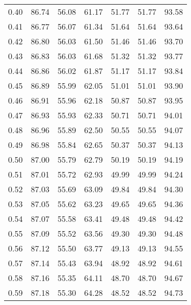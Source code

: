 \begin{tabular}{|c|c|c|c|c|c|c|}
      0.40 &     86.74 &     56.08 &      61.17 &   51.77 &      51.77 &         93.58 \\
      0.41 &     86.77 &     56.07 &      61.34 &   51.64 &      51.64 &         93.64 \\
      0.42 &     86.80 &     56.03 &      61.50 &   51.46 &      51.46 &         93.70 \\
      0.43 &     86.83 &     56.03 &      61.68 &   51.32 &      51.32 &         93.77 \\
      0.44 &     86.86 &     56.02 &      61.87 &   51.17 &      51.17 &         93.84 \\
      0.45 &     86.89 &     55.99 &      62.05 &   51.01 &      51.01 &         93.90 \\
      0.46 &     86.91 &     55.96 &      62.18 &   50.87 &      50.87 &         93.95 \\
      0.47 &     86.93 &     55.93 &      62.33 &   50.71 &      50.71 &         94.01 \\
      0.48 &     86.96 &     55.89 &      62.50 &   50.55 &      50.55 &         94.07 \\
      0.49 &     86.98 &     55.84 &      62.65 &   50.37 &      50.37 &         94.13 \\
      0.50 &     87.00 &     55.79 &      62.79 &   50.19 &      50.19 &         94.19 \\
      0.51 &     87.01 &     55.72 &      62.93 &   49.99 &      49.99 &         94.24 \\
      0.52 &     87.03 &     55.69 &      63.09 &   49.84 &      49.84 &         94.30 \\
      0.53 &     87.05 &     55.62 &      63.23 &   49.65 &      49.65 &         94.36 \\
      0.54 &     87.07 &     55.58 &      63.41 &   49.48 &      49.48 &         94.42 \\
      0.55 &     87.09 &     55.52 &      63.56 &   49.30 &      49.30 &         94.48 \\
      0.56 &     87.12 &     55.50 &      63.77 &   49.13 &      49.13 &         94.55 \\
      0.57 &     87.14 &     55.43 &      63.94 &   48.92 &      48.92 &         94.61 \\
      0.58 &     87.16 &     55.35 &      64.11 &   48.70 &      48.70 &         94.67 \\
      0.59 &     87.18 &     55.30 &      64.28 &   48.52 &      48.52 &         94.73 \\

\end{tabular}
